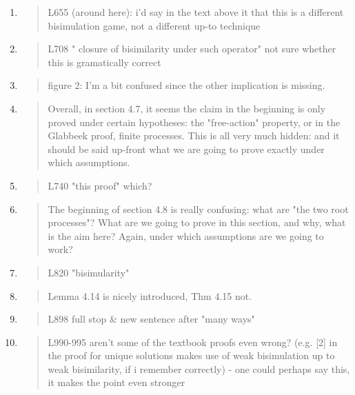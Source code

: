 \begin{enumerate}
\item \begin{quote}
    L655 (around here): i'd say in the text above it that this is a
    different bisimulation game, not a different up-to technique
  \end{quote}

\item \begin{quote}
    L708 " closure of bisimilarity under such operator" not sure whether this is gramatically correct
  \end{quote}

\item \begin{quote}
    figure 2: I'm a bit confused since the other implication is missing. 
  \end{quote}

\item \begin{quote}
    Overall, in section 4.7, it seems the claim in the beginning is
    only proved under certain hypotheses: the "free-action" property,
    or in the Glabbeek proof, finite processes. This is all very much
    hidden: and it should be said up-front what we are going to prove
    exactly under which assumptions.
  \end{quote}

\item \begin{quote}
    L740 "this proof" which? 
  \end{quote}

\item \begin{quote}
    The beginning of section 4.8 is really confusing: what are "the
    two root processes"? What are we going to prove in this section,
    and why, what is the aim here? Again, under which assumptions are
    we going to work?
  \end{quote}

\item \begin{quote}
    L820 "bisimularity"
  \end{quote}

\item \begin{quote}
    Lemma 4.14 is nicely introduced, Thm 4.15 not. 
  \end{quote}

\item \begin{quote}
    L898 full stop \& new sentence after "many ways"
  \end{quote}

\item \begin{quote}
    L990-995 aren't some of the textbook proofs even wrong? (e.g. [2]
    in the proof for unique solutions makes use of weak bisimulation
    up to weak bisimilarity, if i remember correctly) - one could
    perhaps say this, it makes the point even stronger
  \end{quote}

\end{enumerate}


